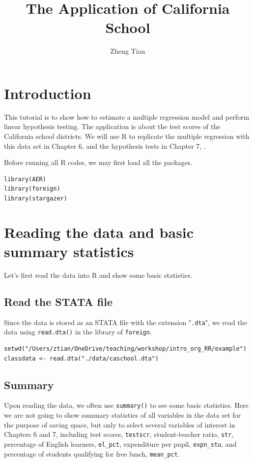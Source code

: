 \documentclass[11pt]{article}
\author{Zheng Tian}
\date{}
\title{The Application of California School}
\begin{document}
\maketitle


\section{Introduction}
\label{sec:org351368d}
This tutorial is to show how to estimate a multiple regression model
and perform linear hypothesis testing. The application is about the
test scores of the California school districts. We will use R to
replicate the multiple regression with this data set in Chapter 6, and
the hypothesis tests in Chapter 7, \citet{StockWatson2011}.

Before running all R codes, we may first load all the packages.
\begin{verbatim}
library(AER)
library(foreign)
library(stargazer)
\end{verbatim}


\section{Reading the data and basic summary statistics}
\label{sec:orgc71fbb1}
Let's first read the data into R and show some basic statistics.
\subsection*{Read the STATA file}
\label{sec:org0c0539c}
Since the data is stored as an STATA file with the extension
"\texttt{.dta}", we read the data using \texttt{read.dta()} in the library of
\texttt{foreign}.

\begin{verbatim}
setwd("/Users/ztian/OneDrive/teaching/workshop/intro_org_RR/example")
classdata <- read.dta("./data/caschool.dta")
\end{verbatim}

\subsection*{Summary}
\label{sec:orgfd9b14f}
Upon reading the data, we often use \texttt{summary()} to see some basic
statistics. Here we are not going to show summary statistics of all
variables in the data set for the purpose of saving space, but only to
select several variables of interest in Chapters 6 and 7, including
test scores, \texttt{testscr}, student-teacher ratio, \texttt{str}, percentage of
English learners, \texttt{el\_pct}, expenditure per pupil, \texttt{expn\_stu}, and
percentage of students qualifying for free lunch, \texttt{mean\_pct}.
\end{document}

